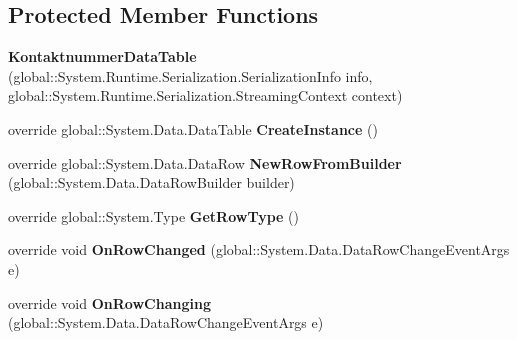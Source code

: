 \subsection*{Protected Member Functions}
\begin{DoxyCompactItemize}
\item 
{\bfseries Kontaktnummer\+Data\+Table} (global\+::\+System.\+Runtime.\+Serialization.\+Serialization\+Info info, global\+::\+System.\+Runtime.\+Serialization.\+Streaming\+Context context)\hypertarget{class_products_1_1_data_1_1ds_sage_1_1_kontaktnummer_data_table_ac1e6ec153b100cd6b38b3054cc7ff45c}{}\label{class_products_1_1_data_1_1ds_sage_1_1_kontaktnummer_data_table_ac1e6ec153b100cd6b38b3054cc7ff45c}

\item 
override global\+::\+System.\+Data.\+Data\+Table {\bfseries Create\+Instance} ()\hypertarget{class_products_1_1_data_1_1ds_sage_1_1_kontaktnummer_data_table_a95c085d6a09c182dc6e0b49307afec07}{}\label{class_products_1_1_data_1_1ds_sage_1_1_kontaktnummer_data_table_a95c085d6a09c182dc6e0b49307afec07}

\item 
override global\+::\+System.\+Data.\+Data\+Row {\bfseries New\+Row\+From\+Builder} (global\+::\+System.\+Data.\+Data\+Row\+Builder builder)\hypertarget{class_products_1_1_data_1_1ds_sage_1_1_kontaktnummer_data_table_af14c852935f57e91801a095f7500375f}{}\label{class_products_1_1_data_1_1ds_sage_1_1_kontaktnummer_data_table_af14c852935f57e91801a095f7500375f}

\item 
override global\+::\+System.\+Type {\bfseries Get\+Row\+Type} ()\hypertarget{class_products_1_1_data_1_1ds_sage_1_1_kontaktnummer_data_table_a7f11a42101da8be4c57f7dda6ce4f4e1}{}\label{class_products_1_1_data_1_1ds_sage_1_1_kontaktnummer_data_table_a7f11a42101da8be4c57f7dda6ce4f4e1}

\item 
override void {\bfseries On\+Row\+Changed} (global\+::\+System.\+Data.\+Data\+Row\+Change\+Event\+Args e)\hypertarget{class_products_1_1_data_1_1ds_sage_1_1_kontaktnummer_data_table_a438ef0d231397e588638df1ebc1c9678}{}\label{class_products_1_1_data_1_1ds_sage_1_1_kontaktnummer_data_table_a438ef0d231397e588638df1ebc1c9678}

\item 
override void {\bfseries On\+Row\+Changing} (global\+::\+System.\+Data.\+Data\+Row\+Change\+Event\+Args e)\hypertarget{class_products_1_1_data_1_1ds_sage_1_1_kontaktnummer_data_table_a948bec9572eba1b46fc7e4a1fd851306}{}\label{class_products_1_1_data_1_1ds_sage_1_1_kontaktnummer_data_table_a948bec9572eba1b46fc7e4a1fd851306}


\end{DoxyCompactItemize}
